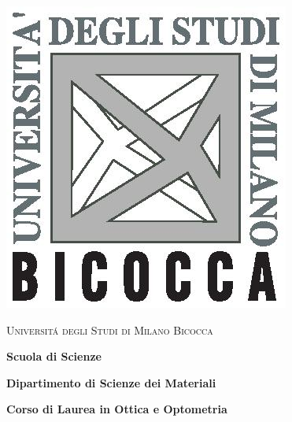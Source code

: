 \documentclass [a4paper,11pt]{book}
\begin{document}
\frontmatter

\newpage
\thispagestyle{empty}
\noindent
\hspace*{-1mm}
\includegraphics[width=0.2\columnwidth]{source/immagini/logo-bicocca-gray.jpg}
\hspace*{2mm}
\begin{minipage}[b][][c]{0.8\columnwidth}
\begin{spacing}{1.4}
{\large\textsc{Universit\'a degli Studi di Milano Bicocca}\par}
{\large\textbf{Scuola di Scienze}\par}
{\large\textbf{Dipartimento di Scienze dei Materiali}\par}
{\large\textbf{Corso di Laurea in Ottica e Optometria}\par}
\end{spacing}
\end{minipage}
\vfill
\end{document}
